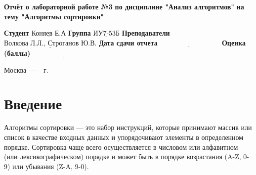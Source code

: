 \documentclass[12pt]{report}
\begin{document}
\begin{titlepage}
		
		\begin{center}
			\noindent\begin{minipage}{1.3\textwidth}\centering
				\Large\textbf{  Отчёт о лабораторной работе №3}\newline
				\textbf{по дисциплине "Анализ алгоритмов"}\newline
				\textbf{на тему "Алгоритмы сортировки"}\newline\newline
			\end{minipage}
		\end{center}
		
		\noindent\textbf{Студент} $\underline{\text{Коняев Е.А}}$\newline\newline
		\noindent\textbf{Группа} $\underline{\text{ИУ7-53Б}}$\newline\newline
		\noindent\textbf{Преподаватели} $\underline{\text{Волкова Л.Л., Строганов Ю.В.}}$\newline\newline
		\noindent\textbf{Дата сдачи отчета}$\underline{\text{~~~~~~~~~~~~~~~~~~~~~~~~~~~}}$\newline\newline
		\noindent\textbf{Оценка (баллы)} $\underline{\text{~~~~~~~~~~~~~~~~~~~~~~~~~~~}}$\newline\newline\newline
		
		\begin{center}
			\vfill
			Москва~---~\the\year~г.
		\end{center}
	\end{titlepage}
	
	\setcounter{page}{2}
	\tableofcontents
	
	\newpage
	\chapter*{Введение}
	
	
	
Алгоритмы сортировки — это набор инструкций, которые принимают массив или список в качестве входных данных и упорядочивают элементы в определенном порядке. Сортировка чаще всего осуществляется в числовом или алфавитном (или лексикографическом) порядке и может быть в порядке возрастания (A-Z, 0-9) или убывания (Z-A, 9-0).
\end{document}
